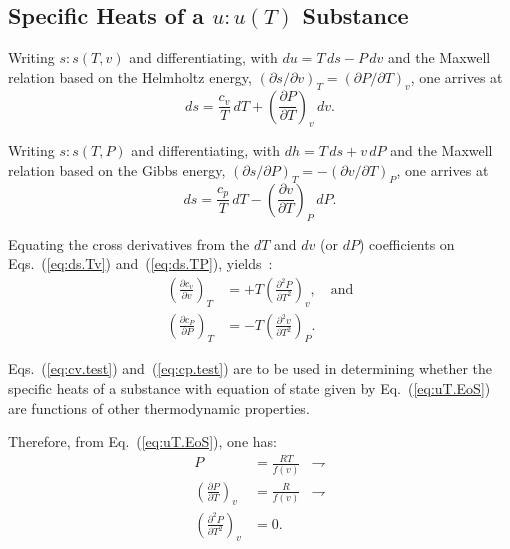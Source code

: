 \documentclass[fleqn,11pt]{SelfArx}
\newcommand{\parxyz}[3]{\left(\frac{\partial {{#1}}}{\partial {{#2}}}\right)_{\!\!\!{#3}}}
\newcommand{\inlxyz}[3]{({\partial {{#1}}}/{\partial {{#2}}})_{{#3}}}
\begin{document}
    \subsection{Specific Heats of a $u\!:\!u(T)$ Substance}\label{sec:specific.heats}

    Writing $s\!:\!s(T, v)$ and differentiating, with $du =  T\,ds  -  P\,dv$  and  the  Maxwell
    relation based on the Helmholtz energy, $\inlxyz svT = \inlxyz PTv$, one arrives at
    \begin{equation}
        ds = \frac{c_v}{T}\,dT + \parxyz PTv\,dv.
        \label{eq:ds.Tv}
    \end{equation}

    Writing $s\!:\!s(T, P)$ and differentiating, with $dh =  T\,ds  +  v\,dP$  and  the  Maxwell
    relation based on the Gibbs energy, $\inlxyz sPT = -\inlxyz vTP$, one arrives at
    \begin{equation}
        ds = \frac{c_p}{T}\,dT - \parxyz vTP\,dP.
        \label{eq:ds.TP}
    \end{equation}

    Equating  the  cross  derivatives  from  the  $dT$  and  $dv$  (or  $dP$)  coefficients   on
    Eqs.~(\ref{eq:ds.Tv}) and~(\ref{eq:ds.TP}), yields~\cite{2013-CengelYA+BolesMA-AMGH}:
    \begin{align}
        \parxyz{c_v}vT & = +T\left(\frac{\partial^2P}{\partial T^2}\right)_{\!\!\!v},
        \quad\mbox{and}\label{eq:cv.test} \\
        \parxyz{c_P}PT & = -T\left(\frac{\partial^2v}{\partial T^2}\right)_{\!\!\!P}.
        \label{eq:cp.test}
    \end{align}

    Eqs.~(\ref{eq:cv.test}) and~(\ref{eq:cp.test}) are to be used  in  determining  whether  the
    specific heats of a substance with equation of  state  given  by  Eq.~(\ref{eq:uT.EoS})  are
    functions of other thermodynamic properties.

    Therefore, from Eq.~(\ref{eq:uT.EoS}), one has:
    \begin{align}
        P & = \frac{RT}{f(v)} & \rightharpoondown \\
        \parxyz PTv & = \frac{R}{f(v)} & \rightharpoondown \\
        \left(\frac{\partial^2P}{\partial T^2}\right)_{\!\!\!v} & = 0.
        \label{eq:cv.test.0}
    \end{align}
\end{document}
